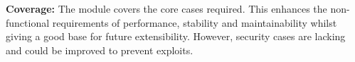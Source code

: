         \item \textbf{Coverage:}
				The module covers the core cases required.
				This enhances the non-functional requirements of performance, stability
				and maintainability whilst giving a good base for future extensibility.
				However, security cases are lacking and could be improved to prevent exploits.

